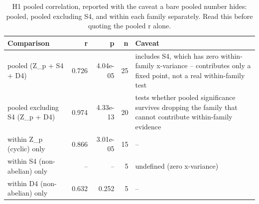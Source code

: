 \begin{table}
\caption{H1 pooled correlation, reported with the caveat a bare pooled number hides: pooled, pooled excluding S4, and within each family separately. Read this before quoting the pooled r alone.}
\label{tab:h1honesty}
\begin{tabular}{lrrrl}
\toprule
Comparison & r & p & n & Caveat \\
\midrule
pooled (Z\_p + S4 + D4) & 0.726 & 4.04e-05 & 25 & includes S4, which has zero within-family x-variance -- contributes only a fixed point, not a real within-family test \\
pooled excluding S4 (Z\_p + D4) & 0.974 & 4.33e-13 & 20 & tests whether pooled significance survives dropping the family that cannot contribute within-family evidence \\
within Z\_p (cyclic) only & 0.866 & 3.01e-05 & 15 & -- \\
within S4 (non-abelian) only & -- & -- & 5 & undefined (zero x-variance) \\
within D4 (non-abelian) only & 0.632 & 0.252 & 5 & -- \\
\bottomrule
\end{tabular}
\end{table}
